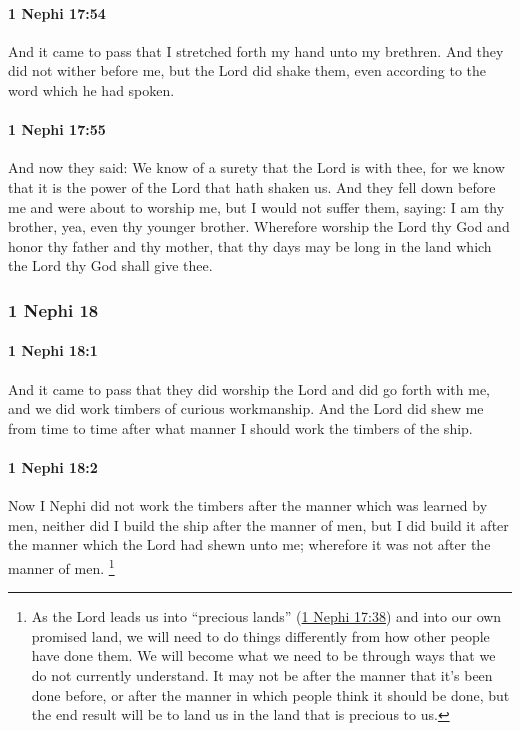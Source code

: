 		\paragraph{1 Nephi 17:54} %
			\label{1NEPHI-17-54}

			And it came to pass that I stretched forth my hand unto my brethren.
			And they did not wither before me, but the Lord did shake them,
			even according to the word which he had spoken.

		\paragraph{1 Nephi 17:55} %
			\label{1NEPHI-17-55}

			And now they said:
			We know of a surety that the Lord is with thee,
			for we know that it is the power of the Lord that hath shaken us.
			And they fell down before me and were about to worship me,
			but I would not suffer them, saying:
			I am thy brother, yea, even thy younger brother.
			Wherefore worship the Lord thy God
			and honor thy father and thy mother,
			that thy days may be long in the land
			which the Lord thy God shall give thee.

	\subsubsection{1 Nephi 18} %
		\label{1NEPHI-18}
		
		\paragraph{1 Nephi 18:1} %
			\label{1NEPHI-18-1}

			And it came to pass that
			they did worship the Lord and did go forth with me,
			and we did work timbers of curious workmanship.
			And the Lord did shew me from time to time
			after what manner I should work the timbers of the ship.

		\paragraph{1 Nephi 18:2} %
			\label{1NEPHI-18-2}

			Now I Nephi did not work the timbers after the manner which was learned by men,
			neither did I build the ship after the manner of men,
			but I did build it after the manner which the Lord had shewn unto me;
			wherefore it was not after the manner of men.%
				\footnote{%
					\label{1NEPHI-18-2-NOTE-men}%
					As the Lord leads us into ``precious lands'' (\hyperref[1NEPHI-17-38]{1 Nephi 17:38}) and into our own promised land, we will need to do things differently from how other people have done them. We will become what we need to be through ways that we do not currently understand. It may not be after the manner that it's been done before, or after the manner in which people think it should be done, but the end result will be to land us in the land that is precious to us.
					}

